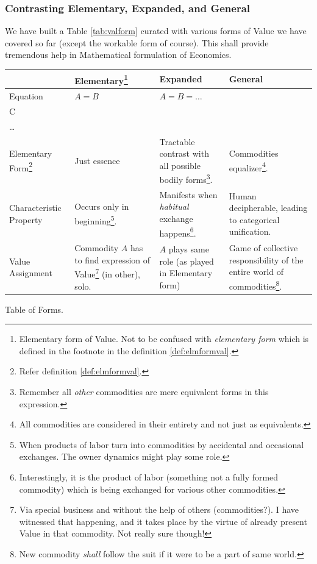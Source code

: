 \documentclass[12pt]{extarticle}
\theoremstyle{definition}
\begin{document}
  \subsubsection{Contrasting Elementary,  Expanded, and General}
  We have built a Table \ref{tab:valform} curated with various forms of Value we have covered so far (except the workable form of course).  This shall provide tremendous help in Mathematical formulation of Economics.
\begin{tabcontainer}
 \begin{tabularx}{\textwidth}{| X | X | X | X |}
 \hline
  & Elementary\footnote{Elementary form of Value.  Not to be confused with \emph{elementary form} which is defined in the footnote in the definition \ref{def:elmformval}.} & Expanded & General \\ [0.5ex] 
 \hline\hline
 Equation & \(
   A = B
 \) & \(A = B = \ldots\) &  \(
   \begin{rcases*} 
    B\\
    C\\
      \ldots
    \end{rcases*} = A\) \\
    Elementary Form\footnote{Refer definition \ref{def:elmformval}.} & Just essence & Tractable contrast with all possible bodily forms\footnote{Remember all \emph{other} commodities are mere equivalent forms in this expression.}.   & Commodities equalizer\footnote{All commodities are considered in their entirety and not just as equivalents.}.\\
    Characteristic Property & Occurs only in beginning\footnote{When products of labor turn into commodities by accidental and occasional exchanges.  The owner dynamics might play some role.}. &  Manifests when \emph{habitual} exchange happens\footnote{Interestingly, it is the product of labor (something not a fully formed commodity) which is being exchanged for various other commodities.}.  & Human decipherable, leading to categorical unification.\\
    Value Assignment & Commodity $A$ has to find expression of Value\footnote{Via special business and without the help of others (commodities?).  I have witnessed that happening, and it takes place by the virtue of already present Value in that commodity.  Not really sure though!} (in other), solo. & $A$ plays same role (as played in Elementary form)  & Game of collective responsibility of the entire world of commodities\footnote{New commodity \emph{shall} follow the suit if it were to be a part of same world.}.\\
    \hline
  \end{tabularx}
  \caption{Table of Forms.}
  \label{tab:valform}
\end{tabcontainer}
\end{document}
